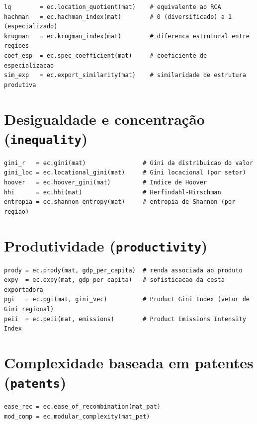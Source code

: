 \documentclass[12pt, a4paper]{article}
\begin{document}
\begin{lstlisting}[caption={\'{I}ndices de especializa\c{c}\~{a}o}]
lq        = ec.location_quotient(mat)    # equivalente ao RCA
hachman   = ec.hachman_index(mat)        # 0 (diversificado) a 1 (especializado)
krugman   = ec.krugman_index(mat)        # diferenca estrutural entre regioes
coef_esp  = ec.spec_coefficient(mat)     # coeficiente de especializacao
sim_exp   = ec.export_similarity(mat)    # similaridade de estrutura produtiva
\end{lstlisting}

\section{Desigualdade e concentra\c{c}\~{a}o (\texttt{inequality})}

\begin{lstlisting}[caption={Indicadores de desigualdade}]
gini_r   = ec.gini(mat)                # Gini da distribuicao do valor
gini_loc = ec.locational_gini(mat)     # Gini locacional (por setor)
hoover   = ec.hoover_gini(mat)         # Indice de Hoover
hhi      = ec.hhi(mat)                 # Herfindahl-Hirschman
entropia = ec.shannon_entropy(mat)     # entropia de Shannon (por regiao)
\end{lstlisting}

\section{Produtividade (\texttt{productivity})}

\begin{lstlisting}[caption={Produtividade e desigualdade dos produtos}]
prody = ec.prody(mat, gdp_per_capita)  # renda associada ao produto
expy  = ec.expy(mat, gdp_per_capita)   # sofisticacao da cesta exportadora
pgi   = ec.pgi(mat, gini_vec)          # Product Gini Index (vetor de Gini regional)
peii  = ec.peii(mat, emissions)        # Product Emissions Intensity Index
\end{lstlisting}

\section{Complexidade baseada em patentes (\texttt{patents})}

\begin{lstlisting}[caption={Indicadores de patentes (input: matriz patente x tecnologia)}]
ease_rec = ec.ease_of_recombination(mat_pat)
mod_comp = ec.modular_complexity(mat_pat)
\end{lstlisting}
\end{document}
